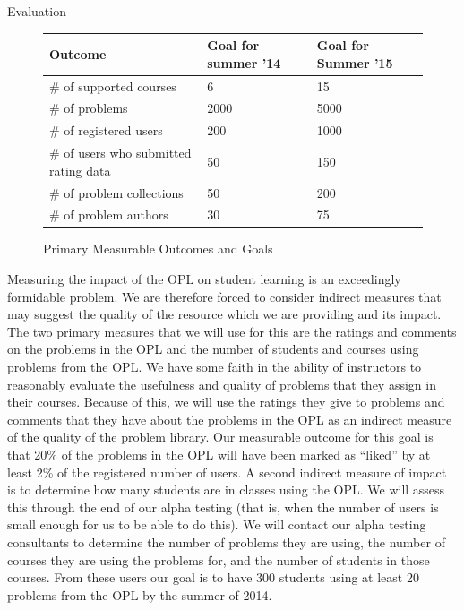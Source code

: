 \documentclass[11pt]{article}
\begin{document}
\begin{section}{Evaluation}
\begin{figure}
\begin{center}
\begin{tabular}{|l|l|l|}
  \hline
  \textbf{Outcome} & \textbf{Goal for summer '14} & \textbf{Goal for
  Summer '15} \\
  \hline
  \hline
  \# of supported courses & 6 & 15 \\
  \hline
  \# of problems & 2000 & 5000 \\
  \hline
  \# of registered users & 200 & 1000 \\
  \hline
  \# of users who submitted rating data & 50 & 150 \\
  \hline
  \# of problem collections & 50 & 200 \\
  \hline
  \# of problem authors & 30 & 75 \\
  \hline
\end{tabular}
\caption{Primary Measurable Outcomes and Goals}
\label{outcomes}
\end{center}
\end{figure}

Measuring the impact of the OPL on student learning is an exceedingly
formidable problem.  We are therefore forced to consider indirect measures
that may suggest the quality of the resource which we are providing and
its impact.  The two primary measures that we will use for this are the
ratings and comments on the problems in the OPL and the number of students
and courses using problems from the OPL.  We have some faith in the
ability of instructors to reasonably evaluate the usefulness and quality
of problems that they assign in their courses.  Because of this, we will
use the ratings they give to problems and comments that they have about
the problems in the OPL as an indirect measure of the quality of the
problem library.  Our measurable outcome for this goal is that 20\% of the
problems in the OPL will have been marked as ``liked'' by at least 2\% of
the registered number of users.  A second indirect measure of impact is to
determine how many students are in classes using the OPL.  We will assess
this through the end of our alpha testing (that is, when the number of
users is small enough for us to be able to do this).  We will contact our
alpha testing consultants to determine the number of problems they are
using, the number of courses they are using the problems for, and the
number of students in those courses.  From these users our goal is to have
300 students using at least 20 problems from the OPL by the summer of
2014. 

\end{section}
\end{document}
